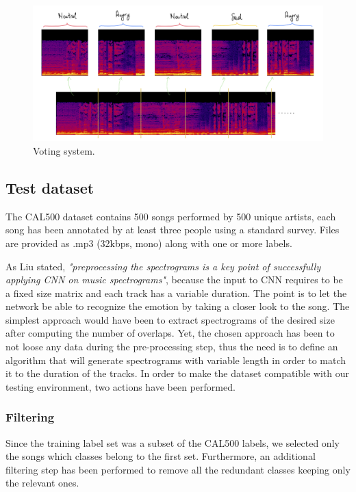\documentclass[10pt,twocolumn,letterpaper]{article}
\begin{document}
   \begin{figure}
      \begin{center}
      \includegraphics[width=0.8\linewidth]{img/voting-system}
      \end{center}
         \caption{Voting system.}
      \label{fig:voting}
      \end{figure}

\subsection{Test dataset}\label{test-dataset}

The CAL500 dataset contains 500 songs performed by 500 unique artists, each song has been annotated by at least three people using a standard survey. Files are provided as .mp3 (32kbps, mono) along with one or more labels.

As Liu \etal \cite{Liu} stated, \textit{"preprocessing the spectrograms is a key point of successfully applying CNN on music spectrograms"}, because the input to CNN requires to be a fixed size matrix and each track has a variable duration. The point is to let the network be able to recognize the emotion by taking a closer look to the song. The simplest approach would have been to extract spectrograms of the desired size after computing the number of overlaps. Yet, the chosen approach has been to not loose any data during the pre-processing step, thus the need is to define an algorithm that will generate spectrograms with variable length in order to match it to the duration of the tracks.
In order to make the dataset compatible with our testing environment, two actions have been performed.

\subsubsection{Filtering}\label{filtering}

Since the training label set was a subset of the CAL500 labels, we selected only the songs which classes belong to the first set. Furthermore, an additional filtering step has been performed to remove all the redundant classes keeping only the relevant ones.
\end{document}
